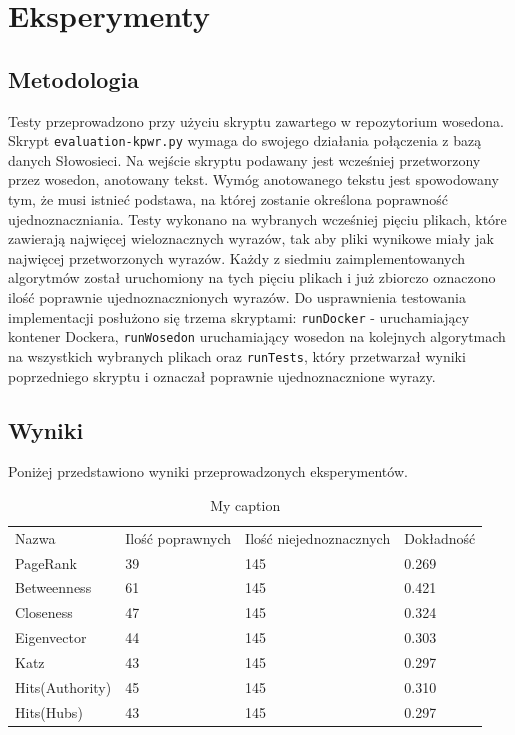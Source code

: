 \chapter{Eksperymenty}
\section{Metodologia}
Testy przeprowadzono przy użyciu skryptu zawartego w repozytorium wosedona. Skrypt \verb|evaluation-kpwr.py| wymaga do swojego działania połączenia z bazą danych Słowosieci. Na wejście skryptu podawany jest wcześniej przetworzony przez wosedon, anotowany tekst. Wymóg anotowanego tekstu jest spowodowany tym, że musi istnieć podstawa, na której zostanie określona poprawność ujednoznaczniania. Testy wykonano na wybranych wcześniej pięciu plikach, które zawierają najwięcej wieloznacznych wyrazów, tak aby pliki wynikowe miały jak najwięcej przetworzonych wyrazów. Każdy z siedmiu zaimplementowanych algorytmów został uruchomiony na tych pięciu plikach i już zbiorczo oznaczono ilość poprawnie ujednoznacznionych wyrazów. Do usprawnienia testowania implementacji posłużono się trzema skryptami: \verb|runDocker| - uruchamiający kontener Dockera, \verb|runWosedon| uruchamiający wosedon na kolejnych algorytmach na wszystkich wybranych plikach oraz \verb|runTests|, który przetwarzał wyniki poprzedniego skryptu i oznaczał poprawnie ujednoznacznione wyrazy.
\section{Wyniki}
Poniżej przedstawiono wyniki przeprowadzonych eksperymentów. 

\begin{table}[H]
\centering
\caption{My caption}
\label{my-label}
\begin{tabular}{llll}
Nazwa           & Ilość poprawnych & Ilość niejednoznacznych & Dokładność \\
PageRank        & 39               & 145                     & 0.269      \\
Betweenness     & 61               & 145                     & 0.421      \\
Closeness       & 47               & 145                     & 0.324      \\
Eigenvector     & 44               & 145                     & 0.303      \\
Katz            & 43               & 145                     & 0.297      \\
Hits(Authority) & 45               & 145                     & 0.310      \\
Hits(Hubs)      & 43               & 145                     & 0.297     
\end{tabular}
\end{table}


